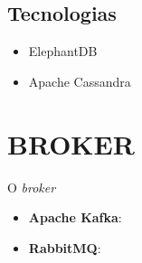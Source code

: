 \subsection{Tecnologias}

\begin{itemize}
    \item ElephantDB
    \item Apache Cassandra
\end{itemize}

\section{BROKER}

O \textit{broker}
\begin{itemize}
    \item \textbf{Apache Kafka}:
    \item \textbf{RabbitMQ}:
\end{itemize}


